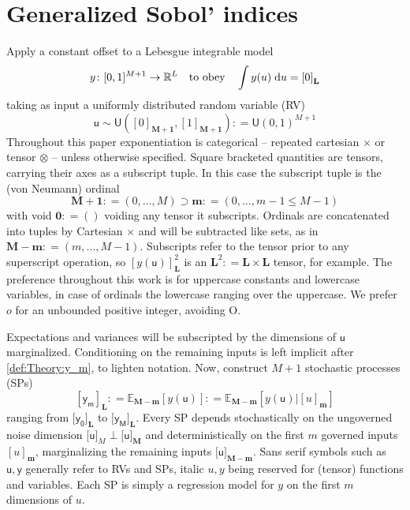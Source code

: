 \documentclass[preprint,12pt]{elsarticle}
\newcommand*{\M}[1]{\ensuremath{#1}\xspace}
\newcommand*{\x}{\times}
\newcommand*{\mi}[1]{\mathbf{#1}}
\newcommand*{\st}[1]{\mathbb{#1}}
\newcommand*{\rv}[1]{\mathsf{#1}}
\newcommand*{\te}[2][]{\left\lbrack{#2}\right\rbrack_{#1}}
\newcommand*{\tte}[2][]{\lbrack{#2}\rbrack_{#1}}
\newcommand*{\deq}{\M{\mathrel{\mathop:}=}}
\newcommand{\T}[1]{\text{#1}}
\newcommand*{\QT}[2][]{\M{\quad\T{#2}\ifthenelse{\equal{#1}{}}{\quad}{#1}}}
\newcommand*{\ev}[3][]{\mathbb{E}_{#3}^{#1}\!\left\lbrack{#2}\right\rbrack}
\newcommand*{\uni}[2]{\mathsf{U}\!\left({#1,#2}\right)}
\newcommand*{\uniti}{\lbrack 0,1\rbrack}
\begin{document}
\section{Generalized Sobol' indices}\label{sec:GSI}
    Apply a constant offset to a Lebesgue integrable model
    \begin{equation} \label{def:GSI:y}
        y \colon \uniti^{M+1} \rightarrow \st{R}^{L} \QT{to obey} \int y(u) \; \mathrm{d}u = \te[\mi{L}]{0}
    \end{equation}
    taking as input a uniformly distributed random variable (RV)
    \begin{equation} \label{def:GSI:u}
        \rv{u} \sim \uni{\te[\mi{M+1}]{0}}{\te[\mi{M+1}]{1}} \deq \uni{0}{1}^{M+1}
    \end{equation}
    Throughout this paper exponentiation is categorical -- repeated cartesian $\x$ or tensor $\otimes$ -- unless otherwise specified. Square bracketed quantities are tensors, carrying their axes as a subscript tuple. In this case the subscript tuple is the (von Neumann) ordinal
    \begin{equation*}
        \mi{M+1} \deq (0,\ldots,M) \supset \mi{m} \deq (0,\ldots,m-1 \leq M-1)
    \end{equation*}
    with void $\mi{0}\deq ()$ voiding any tensor it subscripts. Ordinals are concatenated into tuples by Cartesian $\times$ and will be subtracted like sets, as in $\mi{M-m} \deq (m,\ldots,M-1)$. 
    Subscripts refer to the tensor prior to any superscript operation, so $\te[\mi{L}]{y(\rv{u})}^{2}$ is an $\mi{L}^{2} \deq \mi{L\x L}$ tensor, for example.
    The preference throughout this work is for uppercase constants and lowercase variables, in case of ordinals the lowercase ranging over the uppercase. We prefer $o$ for an unbounded positive integer, avoiding O.

    Expectations and variances will be subscripted by the dimensions of $\rv{u}$ marginalized. Conditioning on the remaining inputs is left implicit after \cref{def:Theory:y_m}, to lighten notation.
    Now, construct $M+1$ stochastic processes (SPs)
    \begin{equation}\label{def:Theory:y_m}
        \te[\mi{L}]{\rv{y_m}} \deq \ev{y(\rv{u})}{\mi{M-m}} \deq \ev{y(\rv{u}) \big\vert \te[\mi{m}]{u}}{\mi{M-m}}
    \end{equation}
    ranging from $\tte[\mi{L}]{\rv{y_0}}$ to $\tte[\mi{L}]{\rv{y_M}}$. Every SP depends stochastically on the ungoverned noise dimension $\tte[M]{\rv{u}} \perp \tte[\mi{M}]{\rv{u}}$ and deterministically on the first $m$ governed inputs $\te[\mi{m}]{u}$, marginalizing the remaining inputs $\tte[\mi{M-m}]{\rv{u}}$. 
    Sans serif symbols such as $\rv{u,y}$ generally refer to RVs and SPs, italic $u,y$ being reserved for (tensor) functions and variables. Each SP is simply a regression model for $y$ on the first $m$ dimensions of $u$.
    
\end{document}
